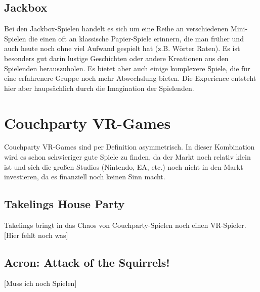 \subsection{Jackbox}
Bei den Jackbox-Spielen handelt es sich um eine Reihe an verschiedenen Mini-Spielen die einen oft an klassische Papier-Spiele erinnern, die man früher und auch heute noch ohne viel Aufwand gespielt hat (z.B. Wörter Raten). Es ist besonders gut darin lustige Geschichten oder andere Kreationen aus den Spielenden herauszuholen. Es bietet aber auch einige komplexere Spiele, die für eine erfahrenere Gruppe noch mehr Abwechslung bieten. Die Experience entsteht hier aber haupsächlich durch die Imagination der Spielenden.

\section{Couchparty VR-Games}

Couchparty VR-Games sind per Definition asymmetrisch. In dieser Kombination wird es schon schwieriger gute Spiele zu finden, da der Markt noch relativ klein ist und sich die großen Studios (Nintendo, EA, etc.) noch nicht in den Markt investieren, da es finanziell noch keinen Sinn macht.

\subsection{Takelings House Party}

Takelings bringt in das Chaos von Couchparty-Spielen noch einen VR-Spieler. [Hier fehlt noch was]

\subsection{Acron: Attack of the Squirrels!}
[Muss ich noch Spielen]